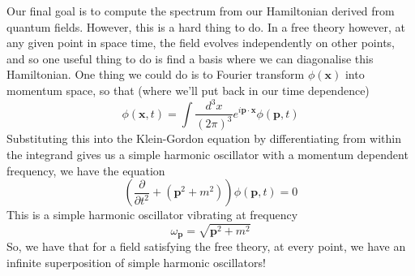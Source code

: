 \documentclass[11pt, oneside]{article}   	%
\theoremstyle{newline}
\theoremstyle{newline}
\theoremstyle{newline}
\theoremstyle{newline}
\theoremstyle{newline}
\begin{document}
Our final goal is to compute the spectrum from our Hamiltonian derived from quantum fields. However, this is a hard thing to do. In a free theory however, at any given point in space time, the field evolves independently on other points, and so one useful thing to do is find a basis where we can diagonalise this Hamiltonian. One thing we could do is to Fourier transform $\phi(\mathbf{x} ) $ into momentum space, so that (where we'll put back in our time dependence) 
\[
\phi( \mathbf{x}, t ) = \int \frac{ d^3 x }{ ( 2 \pi )^3 } e^{ i \mathbf{p} \cdot \mathbf{ x} }  \phi( \mathbf{ p }, t ) 
\]
Substituting this into the Klein-Gordon equation by differentiating from within the integrand gives us a simple harmonic oscillator with a momentum dependent frequency, we have the equation 
\[
\left( \frac{ \partial}{ \partial t^ 2 } + ( \mathbf{p}^ 2 + m^2 ) \right) \phi( \mathbf{p}, t ) = 0 
\] This is a simple harmonic oscillator vibrating at frequency 
\[ 
\omega_\mathbf{p} = \sqrt{ \mathbf{p}^2 + m^2 } 
\] So, we have that for a field satisfying the free theory, at every point, we have an infinite superposition of simple harmonic oscillators!
\end{document}
